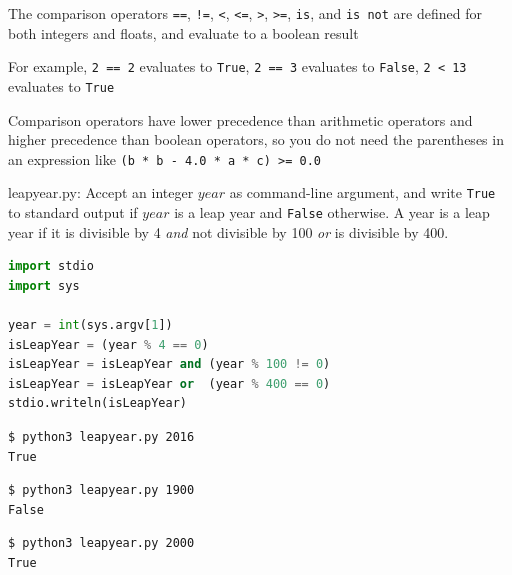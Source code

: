 \documentclass[8pt,a4paper,compress]{beamer}
\begin{document}
\begin{frame}[fragile]
\pause

The comparison operators \lstinline{==}, \lstinline{!=}, \lstinline{<}, \lstinline{<=}, \lstinline{>}, \lstinline{>=}, \lstinline{is}, and \lstinline{is not} are defined for both integers and floats, and evaluate to a boolean result

\pause\bigskip

For example, \lstinline{2 == 2} evaluates to \lstinline{True}, \lstinline{2 == 3} evaluates to \lstinline{False}, \lstinline{2 < 13} evaluates to \lstinline{True} 

\pause\bigskip

Comparison operators have lower precedence than arithmetic operators and higher precedence than boolean operators, so you do not need the parentheses in an expression like \lstinline{(b * b - 4.0 * a * c) >= 0.0}
\end{frame}

\begin{frame}[fragile]
\pause

\begin{framed}
\tiny leapyear.py: Accept an integer $year$ as command-line argument, and write \lstinline{True} to standard output if $year$ is a leap year and \lstinline{False} otherwise. A year is a leap year if it is divisible by 4 \emph{and} not divisible by 100 \emph{or} is divisible by 400.
\end{framed}

\begin{lstlisting}[language=Python,style=focusin]
import stdio
import sys

year = int(sys.argv[1])
isLeapYear = (year % 4 == 0)
isLeapYear = isLeapYear and (year % 100 != 0)
isLeapYear = isLeapYear or  (year % 400 == 0)
stdio.writeln(isLeapYear)
\end{lstlisting}

\pause\bigskip

\begin{lstlisting}[language={},style=focusin]
$ python3 leapyear.py 2016
True
\end{lstlisting}

\pause\bigskip

\begin{lstlisting}[language={},style=focusin]
$ python3 leapyear.py 1900
False
\end{lstlisting}

\pause\bigskip

\begin{lstlisting}[language={},style=focusin]
$ python3 leapyear.py 2000
True
\end{lstlisting}
\end{frame}
\end{document}
